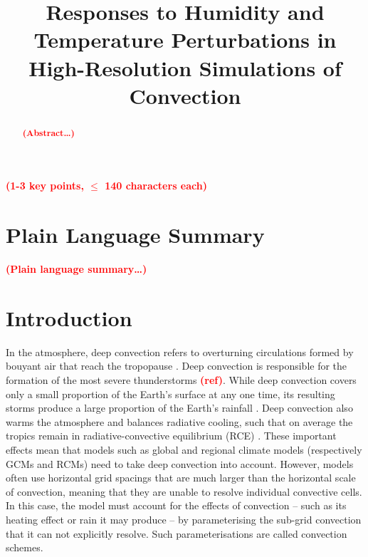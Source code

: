 \documentclass[draft]{agujournal2019}
\newcommand{\todo}[1]{\textcolor{red}{\textbf{(#1)}}}
\begin{document}
\title{Responses to Humidity and Temperature Perturbations in High-Resolution Simulations of Convection}




\begin{keypoints}
\item \todo{1-3 key points, $\leq$ 140 characters each}
\end{keypoints}

\justifying
\begin{abstract}
\todo{Abstract\ldots}
\end{abstract}

\section*{Plain Language Summary}
\todo{Plain language summary\ldots}

\section{Introduction}

In the atmosphere, deep convection refers to overturning circulations formed by
bouyant air that reach the tropopause \cite{Wallace_2006}. Deep convection is
responsible for the formation of the most severe thunderstorms \todo{ref}. While
deep convection covers only a small proportion of the Earth's surface at any one
time, its resulting storms produce a large proportion of the Earth's rainfall
\cite{Wallace_2006}. Deep convection also warms the atmosphere and balances
radiative cooling, such that on average the tropics remain in
radiative-convective equilibrium (RCE) \cite{Manabe_JAS_1964}. These important
effects mean that models such as global and regional climate models
(respectively GCMs and RCMs) need to take deep convection into account. However,
models often use horizontal grid spacings that are much larger than the
horizontal scale of convection, meaning that they are unable to resolve
individual convective cells. In this case, the model must account for the
effects of convection -- such as its heating effect or rain it may produce -- by
parameterising the sub-grid convection that it can not explicitly resolve. Such
parameterisations are called convection schemes. 
\end{document}
